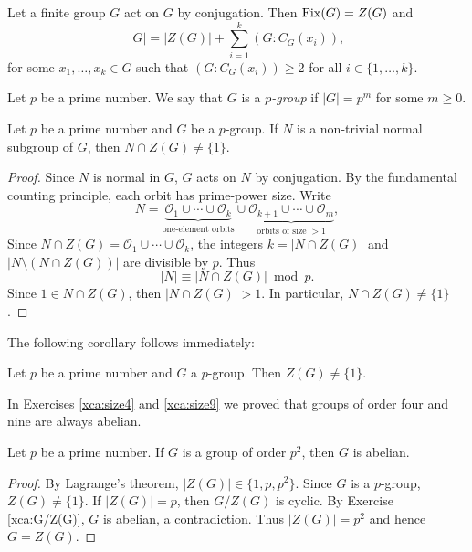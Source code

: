 \begin{example}
Let a finite group $G$ act on $G$ by conjugation. 
Then $\operatorname{Fix}(G)=Z(G)$ and 
\[
|G|=|Z(G)|+\sum_{i=1}^k(G:C_G(x_i)),
\]
for some $x_1,\dots,x_k\in G$ such that 
$(G:C_G(x_i))\geq2$ for all $i\in\{1,\dots,k\}$.
\end{example}

\begin{definition}
Let $p$ be a prime number. We say 
that $G$ is a \emph{$p$-group} if $|G|=p^m$ for some $m\geq0$.
\end{definition}

\begin{theorem}
Let $p$ be a prime number and 
$G$ be a $p$-group. If $N$ is a non-trivial normal subgroup of $G$, then
$N\cap Z(G)\ne\{1\}$.
\end{theorem}

\begin{proof}
Since $N$ is normal in $G$, $G$ acts on $N$ by conjugation. 
By the fundamental counting principle,
each orbit has prime-power size. Write 
\[
N=\underbrace{\mathcal{O}_1\cup\cdots\cup \mathcal{O}_k}_{\text{one-element orbits}}\cup\underbrace{\mathcal{O}_{k+1}\cup\cdots\cup\mathcal{O}_m}_{\text{orbits of size $>1$}},
\]
Since $N\cap Z(G)=\mathcal{O}_1\cup\cdots\cup\mathcal{O}_k$, 
the integers $k=|N\cap Z(G)|$ and $|N\setminus(N\cap Z(G))|$ are divisible by $p$. Thus 
\[
|N|\equiv|N\cap Z(G)|\bmod p.
\]
Since $1\in N\cap Z(G)$, then
$|N\cap Z(G)|>1$. In particular, $N\cap Z(G)\ne\{1\}$.
\end{proof}

The following corollary follows immediately: 

\begin{corollary}
Let $p$ be a prime number and 
$G$ a $p$-group. Then 
$Z(G)\ne\{1\}$.
\end{corollary}

In Exercises \ref{xca:size4} and \ref{xca:size9}
we proved that groups of order four and nine are always abelian. 

\begin{corollary}
    Let $p$ be a prime number. If $G$ is a group of order $p^2$, 
    then $G$ is abelian. 
\end{corollary}

\begin{proof}
By Lagrange's theorem, $|Z(G)|\in\{1,p,p^2\}$. Since $G$ 
is a $p$-group, $Z(G)\ne\{1\}$. If $|Z(G)|=p$, then $G/Z(G)$ 
is cyclic. By Exercise \ref{xca:G/Z(G)}, 
$G$ is abelian, a contradiction. 
Thus $|Z(G)|=p^2$ and hence $G=Z(G)$.
\end{proof}

